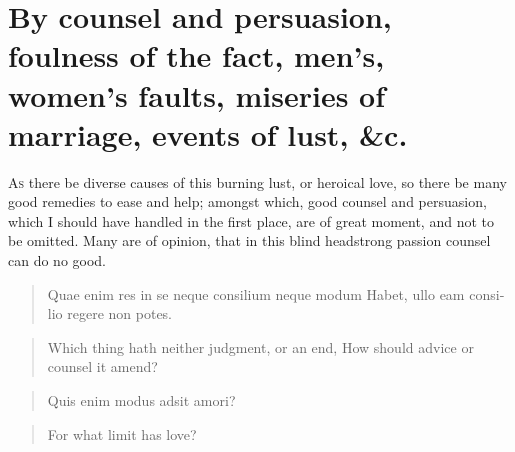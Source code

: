 \section[Counsel and persuasion]{By counsel and persuasion, foulness of the fact, men's, women's faults, miseries of marriage, events of lust, \&c.}

\lettrine{A}{s} there be diverse causes of this burning lust, or heroical love, so
there be many good remedies to ease and help; amongst which, good
counsel and persuasion, which I should have handled in the first place,
are of great moment, and not to be omitted. Many are of opinion, that
in this blind headstrong passion counsel can do no good.

\begin{latin}
\begin{verse}
Quae enim res in se neque consilium neque modum
Habet, ullo eam consilio regere non potes.
\end{verse}
\end{latin}
\translationrule%
\begin{verse}%
Which thing hath neither judgment, or an end,
How should advice or counsel it amend?
\end{verse}%

\begin{latin}
\begin{verse}
Quis enim modus adsit amori?
\end{verse}
\end{latin}
\translationrule%
\begin{verse}%
For what limit has love?
\end{verse}%

